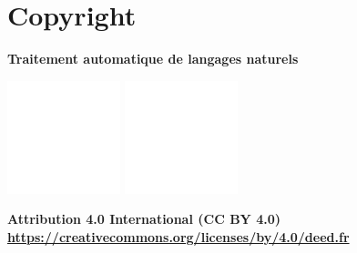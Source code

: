 \documentclass[12pt]{book}
\begin{document}
\fi



\chapter*{Copyright}

\begin{center}
	{\Huge \textbf{Traitement automatique de langages naturels}}
\end{center}


\begin{tcolorbox}[colback=cyan,
	colframe=cyan,  
	arc=0pt,outer arc=0pt,
	valign=top, 
	halign=center,
	width=\textwidth]
	
	\includegraphics[width=.5cm]{../img/licence/cc_icon_white_x2.png}
	\includegraphics[width=.5cm]{../img/licence/attribution_icon_white_x2.png}
	
	\color{white}
	\bfseries Attribution 4.0 International (CC BY 4.0) \\
	\tiny \url{https://creativecommons.org/licenses/by/4.0/deed.fr}
	
\end{tcolorbox}\vspace{-.5cm}
\end{document}
